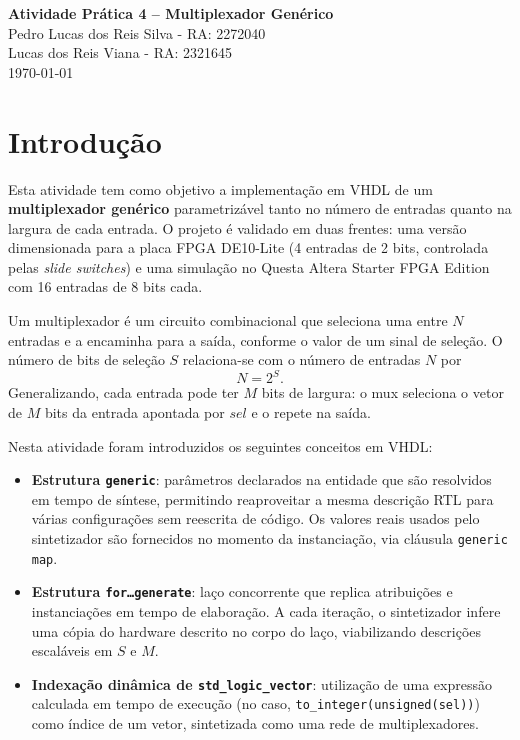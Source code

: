 \documentclass[12pt,a4paper, brazil]{article}
\begin{document}
\begin{center}
{\textbf {\huge Atividade Prática 4 -- Multiplexador Genérico}}\\[5mm]
{\large Pedro Lucas dos Reis Silva - RA: 2272040} \\[5mm]
{\large Lucas dos Reis Viana - RA: 2321645} \\[5mm]
\today\\[5mm]
\end{center}

\section{Introdução}

Esta atividade tem como objetivo a implementação em VHDL de um \textbf{multiplexador genérico} parametrizável tanto no número de entradas quanto na largura de cada entrada. O projeto é validado em duas frentes: uma versão dimensionada para a placa FPGA DE10-Lite (4 entradas de 2 bits, controlada pelas \textit{slide switches}) e uma simulação no Questa Altera Starter FPGA Edition com 16 entradas de 8 bits cada.

Um multiplexador é um circuito combinacional que seleciona uma entre $N$ entradas e a encaminha para a saída, conforme o valor de um sinal de seleção. O número de bits de seleção $S$ relaciona-se com o número de entradas $N$ por
\begin{equation}
    N = 2^S.
\end{equation}
Generalizando, cada entrada pode ter $M$ bits de largura: o mux seleciona o vetor de $M$ bits da entrada apontada por $sel$ e o repete na saída.

Nesta atividade foram introduzidos os seguintes conceitos em VHDL:

\begin{itemize}
    \item \textbf{Estrutura \texttt{generic}}: parâmetros declarados na entidade que são resolvidos em tempo de síntese, permitindo reaproveitar a mesma descrição RTL para várias configurações sem reescrita de código. Os valores reais usados pelo sintetizador são fornecidos no momento da instanciação, via cláusula \texttt{generic map}.
    \item \textbf{Estrutura \texttt{for\ldots generate}}: laço concorrente que replica atribuições e instanciações em tempo de elaboração. A cada iteração, o sintetizador infere uma cópia do hardware descrito no corpo do laço, viabilizando descrições escaláveis em $S$ e $M$.
    \item \textbf{Indexação dinâmica de \texttt{std\_logic\_vector}}: utilização de uma expressão calculada em tempo de execução (no caso, \texttt{to\_integer(unsigned(sel))}) como índice de um vetor, sintetizada como uma rede de multiplexadores.
\end{itemize}
\end{document}
